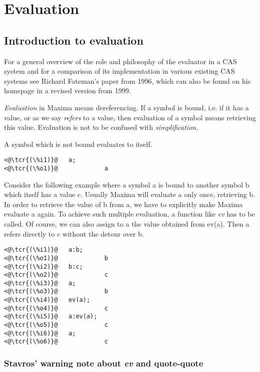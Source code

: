 \documentclass[../Maxima_Workbook.tex]{subfiles}
\begin{document}
	
\chapter{Evaluation}

\section{Introduction to evaluation}

For  a general overview of the role and philosophy of the evaluator in a CAS system and for a comparison of its implementation in various existing CAS systems see Richard Fateman's paper from 1996, which can also be found on his homepage in a revised version from 1999.

\lz \emph{Evaluation} in Maxima means dereferencing. If a symbol is bound, i.e. if it has a value, or as we say \emph{refers} to a value, then evaluation of a symbol means retrieving this value. Evaluation is not to be confused with \emph{simplification}.

\lz A symbol which is not bound evaluates to itself.

\lz \begin{small}
\color{blue}
\begin{lstlisting}
<@\tcr{(\%i1)}@   a;
<@\tcr{(\%o1)}@				a
\end{lstlisting}
\color{black}
\end{small}

\lz Consider the following example where a symbol a is bound to another symbol b which itself has a value c. Usually Maxima will evaluate a only once, retrieving b. In order to retrieve the value of b from a, we have to explicitly make Maxima evaluate a again. To achieve such multiple evaluation, a function like \emph{ev} has to be called. Of course, we can also assign to a the value obtained from ev(a). Then a refers directly to c without the detour over b.

\lz \begin{small}
\color{blue}
\begin{lstlisting}
<@\tcr{(\%i1)}@   a:b;
<@\tcr{(\%o1)}@				b
<@\tcr{(\%i2)}@   b:c;
<@\tcr{(\%o2)}@				c
<@\tcr{(\%i3)}@   a;
<@\tcr{(\%o3)}@				b
<@\tcr{(\%i4)}@   ev(a);
<@\tcr{(\%o4)}@				c
<@\tcr{(\%i5)}@   a:ev(a);
<@\tcr{(\%o5)}@				c
<@\tcr{(\%i6)}@   a;
<@\tcr{(\%o6)}@				c
\end{lstlisting}
\color{black}
\end{small}

\subsection{Stavros' warning note about \emph{ev} and quote-quote}
\end{document}
